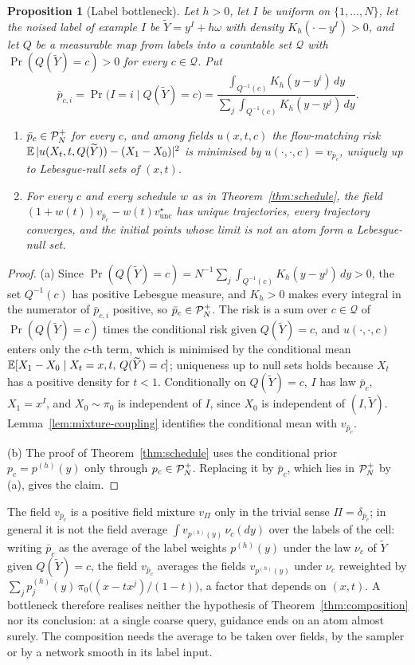 \documentclass{article} %
\theoremstyle{plain}
\newtheorem{proposition}[theorem]{Proposition}
\theoremstyle{definition}
\theoremstyle{remark}
\begin{document}
\begin{proposition}[Label bottleneck]
\label{prop:bottleneck}
Let $h>0$, let $I$ be uniform on $\{1,\dots,N\}$, let the noised label of example $I$ be $\widetilde Y=y^I+h\omega$ with density $K_h(\cdot-y^I)>0$, and let $Q$ be a measurable map
from labels into a countable set $\mathcal Q$ with $\Pr(Q(\widetilde Y)=c)>0$ for every
$c\in\mathcal Q$. Put
\[
\bar p_{c,i}=\Pr\bigl(I=i\mid Q(\widetilde Y)=c\bigr)
=\frac{\int_{Q^{-1}(c)}K_h(y-y^i)\,dy}{\sum_j\int_{Q^{-1}(c)}K_h(y-y^j)\,dy}.
\]
\begin{enumerate}[label=(\alph*),leftmargin=2em]
\item $\bar p_c\in\mathcal{P}_N^{+}$ for every $c$, and among fields $u(x,t,c)$ the flow-matching risk
  $\mathbb{E}\,|u(X_t,t,Q(\widetilde Y))-(X_1-X_0)|^2$ is minimised by $u(\cdot,\cdot,c)=v_{\bar p_c}$,
  uniquely up to Lebesgue-null sets of $(x,t)$.
\item For every $c$ and every schedule $w$ as in Theorem~\ref{thm:schedule}, the field
  $(1+w(t))v_{\bar p_c}-w(t)v_{\mathrm{unc}}^\star$ has unique trajectories, every trajectory
  converges, and the initial points whose limit is not an atom form a Lebesgue-null set.
\end{enumerate}
\end{proposition}
\begin{proof}
(a) Since $\Pr(Q(\widetilde Y)=c)=N^{-1}\sum_j\int_{Q^{-1}(c)}K_h(y-y^j)\,dy>0$, the set
$Q^{-1}(c)$ has positive Lebesgue measure, and $K_h>0$ makes every integral in the numerator of
$\bar p_{c,i}$ positive, so $\bar p_c\in\mathcal{P}_N^{+}$. The risk is a sum over
$c\in\mathcal Q$ of $\Pr(Q(\widetilde Y)=c)$ times the conditional risk given
$Q(\widetilde Y)=c$, and $u(\cdot,\cdot,c)$ enters only the $c$-th term, which is minimised by
the conditional mean $\mathbb{E}[X_1-X_0\mid X_t=x,t,\,Q(\widetilde Y)=c]$; uniqueness up to null sets
holds because $X_t$ has a positive density for $t<1$. Conditionally on $Q(\widetilde Y)=c$, $I$ has
law $\bar p_c$, $X_1=x^I$, and $X_0\sim\pi_0$ is independent of $I$, since $X_0$ is independent of
$(I,\widetilde Y)$. Lemma~\ref{lem:mixture-coupling} identifies the conditional mean with
$v_{\bar p_c}$.

(b) The proof of Theorem~\ref{thm:schedule} uses the conditional prior $p_c=p^{(h)}(y)$ only
through $p_c\in\mathcal{P}_N^{+}$. Replacing it by $\bar p_c$, which lies in $\mathcal{P}_N^{+}$ by (a), gives the claim.
\end{proof}

The field $v_{\bar p_c}$ is a positive field mixture $v_\Pi$ only in the trivial sense
$\Pi=\delta_{\bar p_c}$; in general it is not the field average $\int v_{p^{(h)}(y)}\,\nu_c(dy)$
over the labels of the cell: writing
$\bar p_c$ as the average of the label weights $p^{(h)}(y)$ under the law $\nu_c$ of
$\widetilde Y$ given $Q(\widetilde Y)=c$, the field $v_{\bar p_c}$ averages the fields
$v_{p^{(h)}(y)}$ under $\nu_c$ reweighted by
$\sum_j p^{(h)}_j(y)\,\pi_0\bigl((x-tx^j)/(1-t)\bigr)$, a factor that depends on $(x,t)$. A bottleneck
therefore realises neither the hypothesis of Theorem~\ref{thm:composition} nor its conclusion: at
a single coarse query, guidance ends on an atom almost surely. The composition needs the average
to be taken over fields, by the sampler or by a network smooth in its label input.
\end{document}
